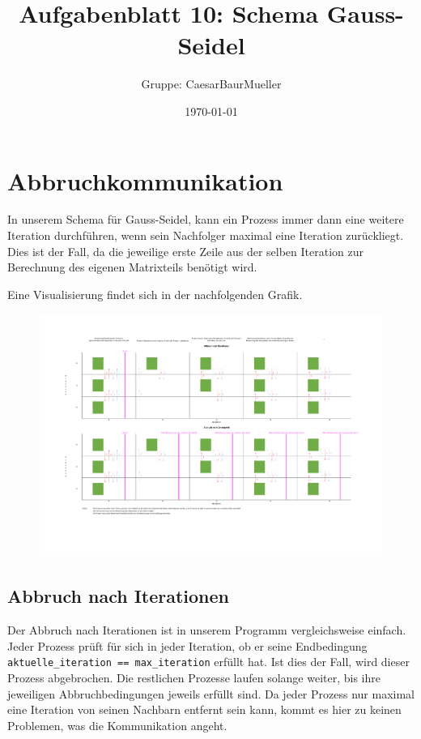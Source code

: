 \documentclass[12pt]{article}
\title{Aufgabenblatt 10: Schema Gauss-Seidel}
\author{Gruppe: CaesarBaurMueller}
\date{\today}
\begin{document}
\maketitle

\begin{sloppypar}

\section*{Abbruchkommunikation}
In unserem Schema für Gauss-Seidel, kann ein Prozess immer dann eine weitere Iteration durchführen, wenn sein Nachfolger maximal eine Iteration zurückliegt. Dies ist der Fall, da die jeweilige erste Zeile aus der selben Iteration zur Berechnung des eigenen Matrixteils benötigt wird.

Eine Visualisierung findet sich in der nachfolgenden Grafik.

\begin{figure}
    \centering
    \vspace*{3em}
    \hspace*{-1em}
    \includegraphics[width=1.1\textwidth]{res/Kommunikationsschema_gauss_seidel.pdf}
\end{figure}

\setcounter{section}{1}

\subsection{Abbruch nach Iterationen}
Der Abbruch nach Iterationen ist in unserem Programm vergleichsweise einfach. Jeder Prozess prüft für sich in jeder Iteration, ob er seine Endbedingung \verb|aktuelle_iteration == max_iteration| erfüllt hat. Ist dies der Fall, wird dieser Prozess abgebrochen. Die restlichen Prozesse laufen solange weiter, bis ihre jeweiligen Abbruchbedingungen jeweils erfüllt sind. Da jeder Prozess nur maximal eine Iteration von seinen Nachbarn entfernt sein kann, kommt es hier zu keinen Problemen, was die Kommunikation angeht.


\end{sloppypar}
\end{document}
